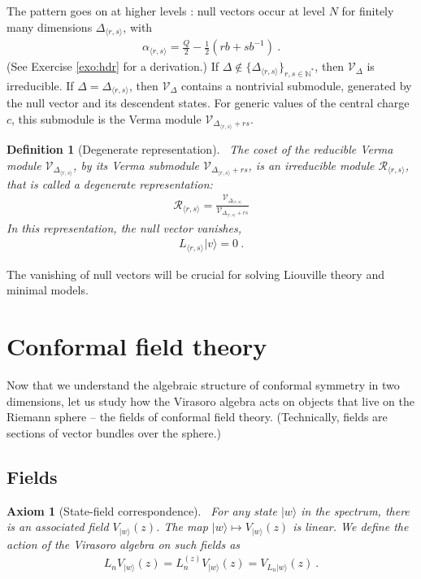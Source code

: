 \documentclass[12pt, a4paper]{article}
\theoremstyle{break}
\newtheorem{hyp}[exo]{Axiom}
\newtheorem{defn}[exo]{Definition}
\begin{document}
The pattern goes on at higher levels \cite{fms97}: null vectors occur at level $N$ for finitely many dimensions $\Delta_{\langle r,s\rangle}$, with
\begin{align}
  \alpha_{\langle r,s\rangle} = \frac{Q}{2} - \frac12(rb+sb^{-1})\ .
  \label{eq:ars}
 \end{align}
 (See Exercise \ref{exo:hdr} for a derivation.)
If $\Delta\notin\{\Delta_{\langle r,s\rangle}\}_{r,s\in\mathbb{N}^*}$, then $\mathcal V_\Delta$ is irreducible. If $\Delta = \Delta_{\langle r,s\rangle}$, then $\mathcal V_\Delta$ contains a nontrivial submodule, generated by the null vector and its descendent states. For generic values of the central charge $c$, this submodule is the Verma module $\mathcal V_{\Delta_{\langle r,s\rangle}+rs}$.

\begin{defn}[Degenerate representation]
 ~\label{def:deg}
The coset of the reducible Verma module $\mathcal V_{\Delta_{\langle r,s\rangle}}$, by its Verma submodule $\mathcal V_{\Delta_{\langle r,s\rangle}+rs}$, is an irreducible module $\mathcal{R}_{\langle r,s\rangle}$, that is called a degenerate representation:
\begin{align}
 \mathcal{R}_{\langle r,s\rangle} = \frac{\mathcal V_{\Delta_{\langle r,s\rangle}}}{\mathcal V_{\Delta_{\langle r,s\rangle}+rs}}
\end{align}
In this representation, the null vector vanishes,
\begin{align}
 L_{\langle r,s\rangle}|v\rangle = 0\ .
\end{align}
\end{defn}
The vanishing of null vectors will be crucial for solving Liouville theory and minimal models.


\section{Conformal field theory}\label{sec:cft}

Now that we understand the algebraic structure of conformal symmetry in two dimensions, let us study how the Virasoro algebra acts on objects that live on the Riemann sphere -- the fields of conformal field theory. (Technically, fields are sections of vector bundles over the sphere.)

\subsection{Fields}

\begin{hyp}[State-field correspondence]
 ~\label{hyp:sfc}
For any state $|w\rangle$ in the spectrum, there is an associated field $V_{|w\rangle}(z)$. The map $|w\rangle \mapsto V_{|w\rangle}(z)$ is linear. We define the action of the Virasoro algebra on such fields as 
\begin{align}
 L_n V_{|w\rangle}(z) =  L_n^{(z)} V_{|w\rangle}(z) = V_{L_n|w\rangle}(z)\ .
\end{align}
\end{hyp}
\end{document}

